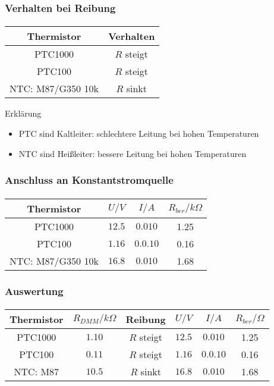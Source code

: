 \begin{frame}
    \frametitle{Verhalten bei Reibung}
    \framesubtitle{}
        \begin{center}
            \begin{tabular}{c|c}
                Thermistor & Verhalten \\
                \hline
                PTC1000 & $R$ steigt\\
                PTC100 & $R$ steigt\\
                NTC: M87/G350 10k & $R$ sinkt
            \end{tabular}
        \end{center}
        \pause
        \begin{block}{Erklärung}
             \begin{itemize}
                 \item PTC sind Kaltleiter: schlechtere Leitung bei hohen Temperaturen
                 \item NTC sind Heißleiter: bessere Leitung bei hohen
                 Temperaturen
             \end{itemize}
        \end{block}
\end{frame}
\begin{frame}
    \frametitle{Anschluss an Konstantstromquelle}
    \framesubtitle{}
        \begin{center}
            \begin{tabular}{c|c|c|c}
                Thermistor & $U/V$ & $I/A$ & $R_{ber}/k\Omega$ \\
                \hline
                PTC1000 & $12.5$  & $0.010$ & 1.25\\
                PTC100  & $1.16$  & $0.0.10$ & 0.16\\
                NTC: M87/G350 10k & $16.8$ & $0.010$ & 1.68 \\
            \end{tabular}
        \end{center}
\end{frame}
\begin{frame}
    \frametitle{Auswertung}
    \framesubtitle{}
    \begin{tabular}{c|c|c||c|c|c}
        Thermistor & $R_{DMM}/k\Omega$ & Reibung & $U/V$ & $I/A$ & $R_{ber}/\Omega$ \\
        \hline
        PTC1000 & $1.10$ & $R$ steigt&  $12.5$&                $0.010$ & 1.25\\           
        PTC100 & $0.11$ &  $R$ steigt&  $1.16$&                $0.0.10$ & 0.16\\
        NTC: M87& $10.5$ & $R$ sinkt &     $16.8$ & $0.010$ & 1.68 
    \end{tabular}
\end{frame}
